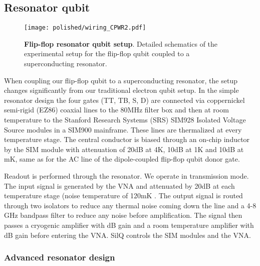 \subsection{Resonator qubit} \label{sec:setup_res}

\begin{figure}
	\centering
	\texttt{[image: polished/wiring\_CPWR2.pdf]}
	\caption[Flip-flop resonator qubit setup]{\textbf{Flip-flop resonator qubit setup}. Detailed schematics of the experimental setup for the flip-flop qubit coupled to a superconducting resonator.  }
	\label{fig:resonator_setup}
\end{figure}

When coupling our flip-flop qubit to a superconducting resonator, the setup changes significantly from our traditional electron qubit setup. In the simple resonator design the four gates (TT, TB, S, D) are connected via coppernickel semi-rigid (EZ86) coaxial lines to the 80MHz filter box and then at room temperature to the Stanford Research Systems (SRS) SIM928 Isolated Voltage Source modules in a SIM900 mainframe. These lines are thermalized at every temperature stage. 
The central conductor is biased through an on-chip inductor by the SIM module with attenuation of 20dB at 4K, 10dB at 1K and 10dB at mK, same as for the AC line of the dipole-coupled flip-flop qubit donor gate. 

Readout is performed through the resonator. We operate in transmission mode. The input signal is generated by the VNA and attenuated by 20dB at each temperature stage (noise temperature of 120mK .
The output signal is routed through two isolators to reduce any thermal noise coming down the line and a 4-8 GHz bandpass filter to reduce any noise before amplification. The signal then passes a cryogenic amplifier with dB gain and a room temperature amplifier with dB gain before entering the VNA. SilQ controls the SIM modules and the VNA. 

\subsubsection{Advanced resonator design}

